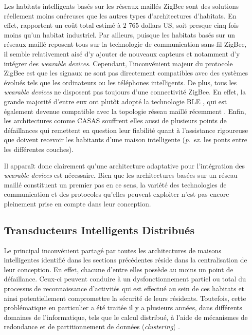 Les habitats intelligents basés sur les réseaux maillés ZigBee sont des solutions réellement moins onéreuses que les autres types d'architectures d'habitats. En effet, \cite{Cook2013} rapportent un coût total estimé à 2 765 dollars US, soit presque cinq fois moins qu'un habitat industriel. Par ailleurs, puisque les habitats basés sur un réseaux maillé reposent tous sur la technologie de communication sans-fil ZigBee, il semble relativement aisé d'y ajouter de nouveaux capteurs et notamment d'y intégrer des \textit{wearable devices}. Cependant, l'inconvénient majeur du protocole ZigBee est que les signaux ne sont pas directement compatibles avec des systèmes évolués tels que les ordinateurs ou les téléphones intelligents. De plus, tous les \textit{wearable devices} ne disposent pas toujours d'une connectivité ZigBee. En effet, la grande majorité d'entre eux ont plutôt adopté la technologie \ac{BLE} \citep{Martin2014}, qui est également devenue compatible avec la topologie réseau maillé récemment \citep{Bluetooth2017}. Enfin, les architectures comme CASAS souffrent elles aussi de plusieurs points de défaillances qui remettent en question leur fiabilité quant à l'assistance rigoureuse que doivent recevoir les habitants d'une maison intelligente (\textit{p. ex.} les ponts entre les différentes couches).

Il apparaît donc clairement qu'une architecture adaptative pour l'intégration des \textit{wearable devices} est nécessaire. Bien que les architectures basées sur un réseau maillé constituent un premier pas en ce sens, la variété des technologies de communication et des protocoles qu'elles peuvent exploiter n'est pas encore pleinement prise en compte dans leur conception.

\subsection{Transducteurs Intelligents Distribués}

Le principal inconvénient partagé par toutes les architectures de maisons intelligentes identifié dans les sections précédentes réside dans la centralisation de leur conception. En effet, chacune d'entre elles possède au moins un point de défaillance. Ceux-ci peuvent conduire à un dysfonctionnement partiel ou total du processus de reconnaissance d'activités qui est effectué au sein de ces habitats et ainsi potentiellement compromettre la sécurité de leurs résidents. Toutefois, cette problématique en particulier a été traitée il y a plusieurs années, dans différents domaines de l'informatique, tels que le calcul distribué, à l'aide de mécanismes de redondance et de partitionnement de données (\textit{clustering}) \citep{Dikaiakos2009,Zaharia2010,JafarnejadGhomi2017}.


